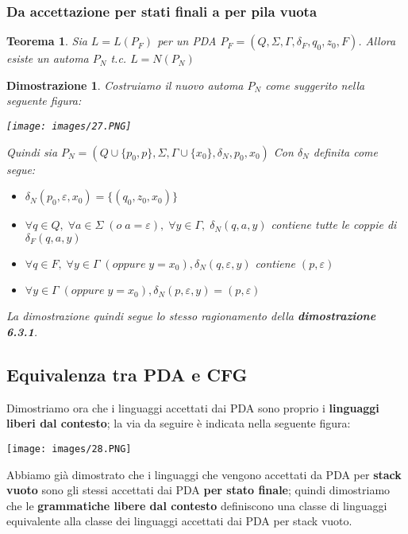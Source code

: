 \documentclass[12pt]{article}
\newtheorem{Teorema}{Teorema}[subsection]
\newtheorem{Dimostrazione}{Dimostrazione}[subsection]
\begin{document}
\subsubsection{Da accettazione per stati finali a per pila vuota}
\begin{Teorema}
    Sia $L = L(P_F)$ per un PDA $P_F = (Q, \Sigma, \Gamma, \delta_F, q_0, z_0, F)$. Allora esiste un automa $P_N$ t.c. $L = N(P_N)$
\end{Teorema}
\begin{Dimostrazione}
    Costruiamo il nuovo automa $P_N$ come suggerito nella seguente figura:
    \begin{center}
        \texttt{[image: images/27.PNG]}
    \end{center}
    Quindi sia $P_N = (Q\cup \{p_0, p\}, \Sigma, \Gamma \cup \{x_0\}, \delta_N, p_0, x_0)$ \newline
    Con $\delta_N$ definita come segue:
    \begin{itemize}
        \item $\delta_N(p_0, \varepsilon, x_0) = \{(q_0, z_0,x_0)\}$
        \item $\forall q \in Q, \; \forall a \in \Sigma \; (o \; a = \varepsilon), \; \forall y \in \Gamma, \; \delta_N(q, a, y)$ contiene tutte le coppie di $\delta_F(q, a, y)$
        \item $\forall q \in F, \; \forall y \in \Gamma \; (oppure \; y = x_0), \delta_N(q, \varepsilon, y)$ contiene $(p, \varepsilon)$
        \item $\forall y \in \Gamma \; (oppure \; y = x_0), \delta_N(p, \varepsilon, y) = (p, \varepsilon)$
    \end{itemize}
    La dimostrazione quindi segue lo stesso ragionamento della \textbf{dimostrazione 6.3.1}.
\end{Dimostrazione}
\subsection{Equivalenza tra PDA e CFG}
Dimostriamo ora che i linguaggi accettati dai PDA sono proprio i \textbf{linguaggi liberi dal contesto}; la via da seguire è indicata nella seguente figura:
\begin{center}
    \texttt{[image: images/28.PNG]}
\end{center}
Abbiamo già dimostrato che i linguaggi che vengono accettati da PDA per \textbf{stack vuoto} sono gli stessi accettati dai PDA \textbf{per stato finale}; quindi dimostriamo che le \textbf{grammatiche libere dal contesto} definiscono una classe di linguaggi equivalente alla classe dei linguaggi accettati dai PDA per stack vuoto.
\end{document}
